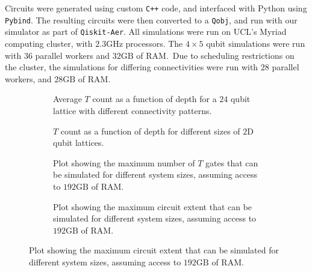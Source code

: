 Circuits were generated using custom \texttt{C++} code, and interfaced with Python using \texttt{Pybind}. The resulting circuits were then converted to a \texttt{Qobj}, and run with our simulator as part of \texttt{Qiskit-Aer}. All simulations were run on UCL's Myriad computing cluster, with $2.3\mathrm{GHz}$ processors. The $4\times5$ qubit simulations were run with $36$ parallel workers and $32\mathrm{GB}$ of RAM.\ Due to scheduling restrictions on the cluster, the simulations for differing connectivities were run with $28$ parallel workers, and $28\mathrm{GB}$ of RAM.
\begin{figure}[H]
\centering
\caption{Resource Analysis of Google circuits on a $20$ qubit lattice.}\label{fig:rc_resources}
\begin{subfigure}[t]{0.48\textwidth}
\begin{scaletikzpicturetowidth}{\textwidth}

\end{scaletikzpicturetowidth}
\caption{Average $T$ count as a function of depth for a $24$ qubit lattice with different connectivity patterns.}\label{fig:t_count_depth}
\end{subfigure}
\begin{subfigure}[t]{0.48\textwidth}
\begin{scaletikzpicturetowidth}{\textwidth}

\end{scaletikzpicturetowidth}
\caption{$T$ count as a function of depth for different sizes of $2$D qubit lattices.}\label{fig:t_count_connectivity}
\end{subfigure}
\begin{subfigure}[t]{0.48\textwidth}
\begin{scaletikzpicturetowidth}{\textwidth}

\end{scaletikzpicturetowidth}
\caption{Plot showing the maximum number of $T$ gates that can be simulated for different system sizes, assuming access to $192\mathrm{GB}$ of RAM.}\label{fig:max_t_bar}
\end{subfigure}
\begin{subfigure}[t]{0.48\textwidth}
\begin{scaletikzpicturetowidth}{\textwidth}

\end{scaletikzpicturetowidth}
\caption{Plot showing the maximum circuit extent that can be simulated for different system sizes, assuming access to $192\mathrm{GB}$ of RAM.}\label{fig:max_extent_bar}
\end{subfigure}
\end{figure}

